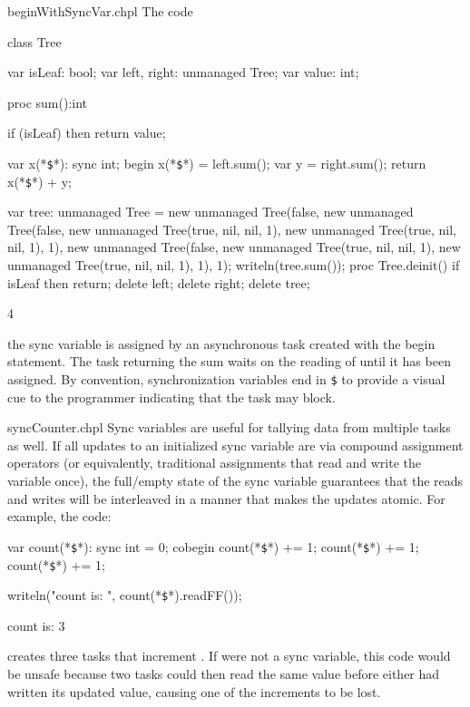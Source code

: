\begin{chapelexample}{beginWithSyncVar.chpl}
The code
\begin{chapel}
class Tree {
  var isLeaf: bool;
  var left, right: unmanaged Tree;
  var value: int;

  proc sum():int {
    if (isLeaf) then
       return value;

    var x(*\texttt{\$}*): sync int;
    begin x(*\texttt{\$}*) = left.sum();
    var y = right.sum();
    return x(*\texttt{\$}*) + y;
  }
}
\end{chapel}
\begin{chapelpost}
var tree: unmanaged Tree = new unmanaged Tree(false, new unmanaged
Tree(false, new unmanaged Tree(true, nil, nil, 1),
                                                 new unmanaged Tree(true, nil, nil, 1), 1),
                                 new unmanaged Tree(false, new unmanaged Tree(true, nil, nil, 1),
                                                 new unmanaged Tree(true, nil, nil, 1), 1), 1);
writeln(tree.sum());
proc Tree.deinit() {
  if isLeaf then return;
  delete left;
  delete right;
}
delete tree;
\end{chapelpost}
\begin{chapeloutput}
4
\end{chapeloutput}
the sync variable  is assigned by an
asynchronous task created with the begin statement.  The task
returning the sum waits on the reading of 
until it has been assigned.  By convention, synchronization variables
end in \texttt{\$} to provide a visual cue to the programmer
indicating that the task may block.
\end{chapelexample}

\begin{chapelexample}{syncCounter.chpl}
Sync variables are useful for tallying data from multiple tasks as
well.  If all updates to an initialized sync variable are via compound
assignment operators (or equivalently, traditional assignments that
read and write the variable once), the full/empty state of the sync
variable guarantees that the reads and writes will be interleaved
in a manner that makes the updates atomic.  For example, the code:
\begin{chapel}
var count(*\texttt{\$}*): sync int = 0;
cobegin {
  count(*\texttt{\$}*) += 1;
  count(*\texttt{\$}*) += 1;
  count(*\texttt{\$}*) += 1;
}
\end{chapel}
\begin{chapelpost}
writeln("count is: ", count(*\texttt{\$}*).readFF());
\end{chapelpost}
\begin{chapeloutput}
count is: 3
\end{chapeloutput}
creates three tasks that increment .
If  were not a sync variable, this code
would be unsafe because two tasks could then read the same value
before either had written its updated value, causing one of the
increments to be lost.
\end{chapelexample}


